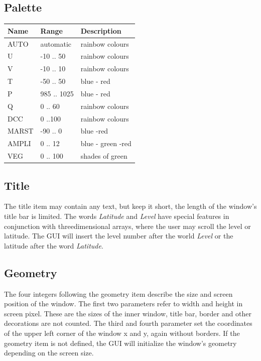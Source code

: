 \subsection{Palette}
\begin{tabular}{|l|l|l|}
\hline
Name     & Range & Description  \\
\hline
   AUTO & automatic & rainbow colours \\
   U &    -10 .. 50 & rainbow colours \\
   V &    -10 .. 10 & rainbow colours \\
   T &    -50 .. 50 & blue - red \\
   P &    985 .. 1025 & blue - red \\ 
   Q &      0 .. 60 & rainbow colours \\
   DCC   &  0 ..100 & rainbow colours \\
   MARST & -90 .. 0 & blue -red \\
   AMPLI & 0 .. 12 & blue - green -red \\
   VEG   & 0 .. 100 & shades of green \\
\hline
\end{tabular}

\subsection{Title}
The title item may contain any text, but keep it short,
the length of the window's title bar is limited.
The words {\em Latitude} and {\em Level} have special
features in conjunction with threedimensional arrays,
where the user may scroll the level or latitude.
The GUI will insert the level number after the world 
{\em Level} or the latitude after the word {\em Latitude}.

\subsection{Geometry}
The four integers following the geometry item describe
the size and screen position of the window.
The first two parameters refer to width and height in 
screen pixel. These are the sizes of the inner window,
title bar, border and other decorations are not counted.
The third and fourth parameter set the coordinates of the
upper left corner of the window x and y, again without borders.
If the geometry item is not defined, the GUI will
initialize the window's geometry depending on the screen size.


